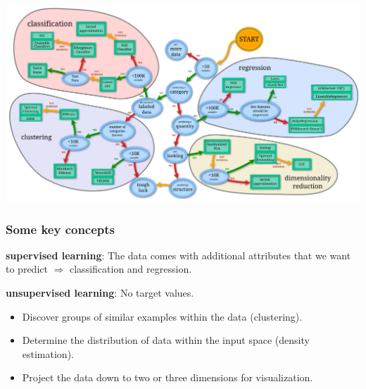 \begin{frame}
\frametitle{}
\hspace*{-1.2cm}
\includegraphics[width=1.2\textwidth]{sklearn_material/overview.png}
% 
\end{frame}


\begin{frame}
\frametitle{Some key concepts}



\textbf{supervised learning}: The data comes with additional
attributes that we want to predict $\Longrightarrow$
classification and regression.\\
\vspace{1cm}

\textbf{unsupervised learning}: No target values. 
\begin{itemize}
\item
Discover groups of similar examples within the data (clustering).
\item
Determine the distribution of data within the input space (density estimation).
\item
Project the data down to two or three dimensions for visualization.
\end{itemize}

\end{frame}




